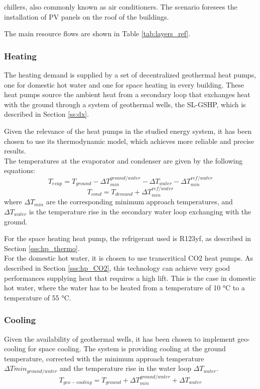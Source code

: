 \documentclass{article}
\begin{document}
 chillers, also commonly known as air conditioners. The scenario foresees the installation of PV panels on the roof of the buildings.


The main resource flows are shown in Table \ref{tab:layers_ref}.


\subsubsection{Heating}
The heating demand is supplied by a set of decentralized geothermal heat pumps, one for domestic hot water and one for space heating in every building. These heat pumps source the ambient heat from a secondary loop that exchanges heat with the ground through a system of geothermal wells, the SL-GSHP, which is described in Section \ref{ss:dx}. 

Given the relevance of the heat pumps in the studied energy system, it has been chosen to use its thermodynamic model, which achieves more reliable and precise results.\\

The temperatures at the evaporator and condenser are given by the following equations:
\begin{equation}
    T_{evap} = T_{ground} - \Delta T_{min}^{ground/water} - \Delta T_{water} - \Delta T_{min}^{ref/water}
\end{equation}
\begin{equation}
    T_{cond} = T_{demand} + \Delta T_{min}^{ref/water}
\end{equation}
where $\Delta T_{min}$ are the corresponding minimum approach temperatures, and $\Delta T_{water}$ is the temperature rise in the secondary water loop exchanging with the ground.

For the space heating heat pump, the refrigerant used is R123yf, as described in Section \ref{sss:hp_thermo}.\\

For the domestic hot water, it is chosen to use transcritical CO2 heat pumps. As described in Section \ref{sss:hp_CO2}, this technology can achieve very good performances supplying heat that requires a high lift. This is the case in domestic hot water, where the water has to be heated from a temperature of 10 \si{\celsius} to a temperature of 55 \si{\celsius}.

\subsubsection{Cooling}
Given the availability of geothermal wells, it has been chosen to implement geo-cooling for space cooling. The system is providing cooling at the ground temperature, corrected with the minimum approach temperature $\Delta Tmin_{ground/water}$ and the temperature rise in the water loop $\Delta T_{water}$.
\begin{equation}
T_{geo-cooling} = T_{ground} + \Delta T_{min}^{ground/water} + \Delta T_{water}
\end{equation}
\end{document}
